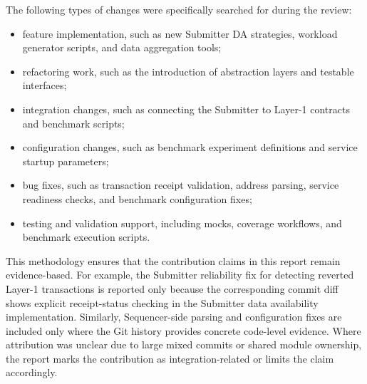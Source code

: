 The following types of changes were specifically searched for during the review:

\begin{itemize}
    \item feature implementation, such as new Submitter DA strategies, workload generator scripts, and data aggregation tools;
    \item refactoring work, such as the introduction of abstraction layers and testable interfaces;
    \item integration changes, such as connecting the Submitter to Layer-1 contracts and benchmark scripts;
    \item configuration changes, such as benchmark experiment definitions and service startup parameters;
    \item bug fixes, such as transaction receipt validation, address parsing, service readiness checks, and benchmark configuration fixes;
    \item testing and validation support, including mocks, coverage workflows, and benchmark execution scripts.
\end{itemize}

This methodology ensures that the contribution claims in this report remain evidence-based. For example, the Submitter reliability fix for detecting reverted Layer-1 transactions is reported only because the corresponding commit diff shows explicit receipt-status checking in the Submitter data availability implementation. Similarly, Sequencer-side parsing and configuration fixes are included only where the Git history provides concrete code-level evidence. Where attribution was unclear due to large mixed commits or shared module ownership, the report marks the contribution as integration-related or limits the claim accordingly.

